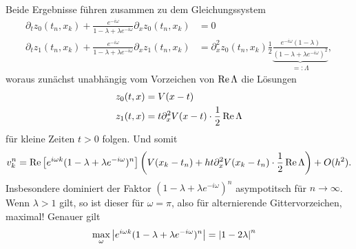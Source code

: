 Beide Ergebnisse führen zusammen zu dem Gleichungssystem
\begin{align}
\partial_t z_0(t_n, x_k) + \frac{e^{- i \omega}}{1 - \lambda + \lambda e^{-i \omega}} \partial_x z_0(t_n, x_k) &= 0\\
\partial_t z_1(t_n, x_k) + \frac{e^{- i \omega}}{1 - \lambda + \lambda e^{-i \omega}} \partial_x z_1(t_n, x_k)
&= \partial^2_x z_0(t_n, x_k) \frac{1}{2} \underbrace{\frac{ e^{-i \omega} (1- \lambda)}{(1 - \lambda + \lambda e^{-i \omega})^2}}_{=: \Lambda},
\end{align}
woraus zunächst unabhängig vom Vorzeichen von $\operatorname{Re} \Lambda$ die Lösungen
\begin{align}
z_0(t,x) &= V(x - t)\\
z_1(t,x) &= t \partial^2_x V(x - t) \cdot \frac 12 \operatorname{Re} \Lambda
\end{align}
für kleine Zeiten $t > 0$ folgen. Und somit
\begin{align*}
v^n_k = \operatorname{Re} \left[ e^{i \omega k} (1 - \lambda + \lambda e^{-i \omega})^n \right] \left( V(x_k - t_n) + h t \partial^2_x V(x_k - t_n) \cdot \frac 12 \operatorname{Re} \Lambda \right) + O(h^2).
\end{align*}
Insbesondere dominiert der Faktor $(1 - \lambda + \lambda e^{-i \omega})^n$ asympotitsch für $n \to \infty$.
Wenn $\lambda > 1$ gilt, so ist dieser für $\omega = \pi$, also für alternierende Gittervorzeichen, maximal! Genauer gilt
\begin{align}
\max_\omega \left|  e^{i \omega k} (1 - \lambda + \lambda e^{-i \omega})^n  \right| &= \left| 1 - 2 \lambda \right|^n
\end{align}

